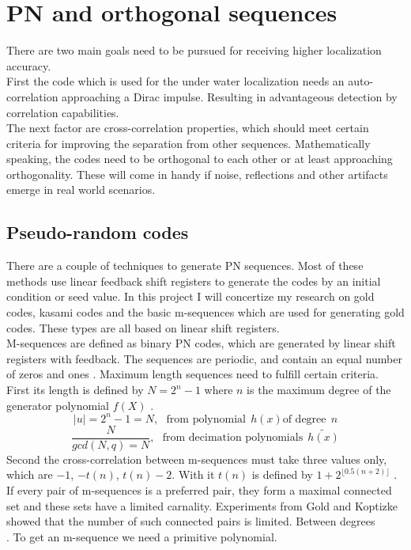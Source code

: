\chapter{PN and orthogonal sequences}

There are two main goals need to be pursued for receiving higher localization accuracy.\\    
First the code which is used for the under water localization needs an auto-correlation approaching a Dirac impulse. Resulting in advantageous detection by correlation capabilities.\\
The next factor are cross-correlation properties, which should meet certain criteria for improving the separation from other sequences. Mathematically speaking, the codes need to be orthogonal to each other or at least approaching orthogonality. These will come in handy if noise, reflections and other artifacts emerge in real world scenarios.

\section{Pseudo-random codes}

There are a couple of techniques to generate PN sequences. Most of these methods use linear feedback shift registers to generate the codes by an initial condition or seed value. In this project I will concertize my research on gold codes, kasami codes and the basic m-sequences which are used for generating gold codes. These types are all based on linear shift registers.\\
M-sequences are defined as binary PN codes, which are generated by linear shift registers with feedback. The sequences are periodic, and contain an equal number of zeros and ones \cite{proakis08}. 
Maximum length sequences need to fulfill certain criteria.  First its length is defined by $N=2^n - 1$ where $n$ is the maximum degree of the generator polynomial $f(X)$ \cite{sarwate80}.
 \begin{equation}
	 \lvert u\rvert=2^n-1=N,~~~\text{from polynomial}~~h(x) \text{of degree}~~n
\end{equation}
\begin{equation}
	\dfrac{N}{gcd(N,q)=N},~~~\text{from decimation polynomials}~~\widetilde{h(x)}
\end{equation}
Second the cross-correlation between m-sequences must take three values only, which are $-1$, $-t(n)$, $t(n) - 2$. With it $t(n)$ is defined by $1+2^{\lfloor0.5(n+2)\rfloor}$ \cite{sarwate80}.
If every pair of m-sequences is a preferred pair, they form a maximal connected set and these sets have a limited carnality. Experiments from Gold and Koptizke showed that the number of such connected pairs is limited. Between degrees $$$$ \cite{gold65}. To get an m-sequence we need a primitive polynomial. 

